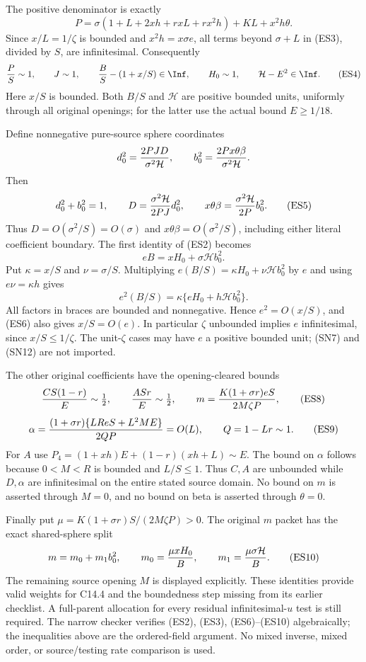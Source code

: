 The positive denominator is exactly
\[
 P=\sigma(1+L+2xh+rxL+rx^2h)+KL+x^2h\theta.
                                                               \tag{ES3}
\]
Since $x/L=1/\zeta$ is bounded and $x^2h=x\sigma e$,
all terms beyond $\sigma+L$ in (ES3), divided by $S$, are
infinitesimal. Consequently
\[
 {P\over S}\sim1,\qquad J\sim1,\qquad
 {B\over S}-(1+x/S)\in\Inf,\qquad
 H_0\sim1,\qquad \mathcal H-E^2\in\Inf.             \tag{ES4}
\]
Here $x/S$ is bounded. Both $B/S$ and $\mathcal H$ are
positive bounded units, uniformly through all original openings;
for the latter use the actual bound $E\ge1/18$.

Define nonnegative pure-source sphere coordinates
\[
 d_0^2={2PJD\over\sigma^2\mathcal H},\qquad
 b_0^2={2Px\theta\beta\over\sigma^2\mathcal H}.
\]
Then
\[
 d_0^2+b_0^2=1,\qquad
 D={\sigma^2\mathcal H\over2PJ}d_0^2,\qquad
 x\theta\beta={\sigma^2\mathcal H\over2P}b_0^2.
                                                               \tag{ES5}
\]
Thus $D=O(\sigma^2/S)=O(\sigma)$ and
$x\theta\beta=O(\sigma^2/S)$, including either literal coefficient
boundary. The first identity of (ES2) becomes
\[
 eB=xH_0+\sigma\mathcal H b_0^2.                     \tag{ES6}
\]
Put $\kappa=x/S$ and $\nu=\sigma/S$. Multiplying
$e(B/S)=\kappa H_0+\nu\mathcal H b_0^2$ by $e$ and using
$e\nu=\kappa h$ gives
\[
 e^2(B/S)=\kappa\{eH_0+h\mathcal H b_0^2\}.
                                                               \tag{ES7}
\]
All factors in braces are bounded and nonnegative. Hence
$e^2=O(x/S)$, and (ES6) also gives $x/S=O(e)$.
In particular $\zeta$ unbounded implies $e$ infinitesimal,
since $x/S\le1/\zeta$. The unit-$\zeta$ cases may have
$e$ a positive bounded unit; (SN7) and (SN12) are not imported.

The other original coefficients have the opening-cleared bounds
\[
 {CS(1-r)\over E}\sim\tfrac12,\qquad
 {ASr\over E}\sim\tfrac12,\qquad
 m={K(1+\sigma r)eS\over2M\zeta P},                  \tag{ES8}
\]
\[
 \alpha={(1+\sigma r)\{LR eS+L^2ME\}\over2QP}
       =O(L),\qquad Q=1-Lr\sim1.                   \tag{ES9}
\]
For $A$ use $P_4=(1+xh)E+(1-r)(xh+L)\sim E$.
The bound on $\alpha$ follows because $0<M<R$ is bounded and
$L/S\le1$. Thus $C,A$ are unbounded while $D,\alpha$ are
infinitesimal on the entire stated source domain. No bound on $m$
is asserted through $M=0$, and no bound on beta is asserted through
$\theta=0$.

Finally put $\mu=K(1+\sigma r)S/(2M\zeta P)>0$. The
original $m$ packet has the exact shared-sphere split
\[
 m=m_0+m_1b_0^2,\qquad
 m_0={\mu xH_0\over B},\qquad
 m_1={\mu\sigma\mathcal H\over B}.                  \tag{ES10}
\]
The remaining source opening $M$ is displayed explicitly. These
identities provide valid weights for C14.4 and the boundedness step
missing from its earlier checklist. A full-parent allocation for every
residual infinitesimal-$u$ test is still required. The narrow checker
verifies (ES2), (ES3), (ES6)--(ES10) algebraically; the inequalities
above are the ordered-field argument. No mixed inverse, mixed order,
or source/testing rate comparison is used.


